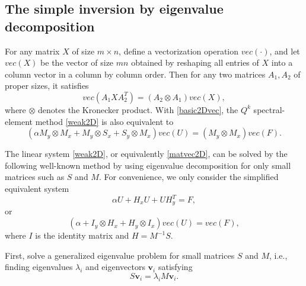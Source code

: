 \documentclass{article}
\begin{document}
\subsection{The simple inversion by eigenvalue decomposition}

For  any matrix $X$ of size $m\times n$, define a vectorization operation $vec(\cdot)$, and let $vec(X)$ be the vector of size $mn$ obtained by reshaping all entries of $X$ into a column vector in a column by column order. Then for any two matrices $A_1, A_2$ of proper sizes, it satisfies
\begin{equation}\label{basic2Dvec}
    vec(A_1XA_2^T) = \left(A_2\otimes A_1\right)vec(X),
\end{equation}
where $\otimes$ denotes the Kronecker product. With \eqref{basic2Dvec}, the $Q^k$ spectral-element method \eqref{weak2D} is also equivalent to 
\begin{equation}\label{matvec2D}
    (\alpha M_{y}\otimes M_{x} + {M_{y}\otimes S_{x} + S_{y}\otimes M_{x}})vec(U) = (M_{y}\otimes M_{x})vec(F).
\end{equation}



The linear system \eqref{weak2D}, or equivalently  \eqref{matvec2D}, can be solved by the following well-known method by using eigenvalue decomposition for only small matrices such as $S$ and $M$. For convenience, we only consider the simplified equivalent system 
\begin{equation}\label{weak2D-2}
    \alpha U  + H_{x}U  +  UH^T_{y} =  F,
\end{equation}
or 
\begin{equation}\label{matvec2D-3}
    (\alpha  + {I_{y}\otimes H_{x} + H_{y}\otimes I_{x}})vec(U) = vec(F),
\end{equation}
where $I$ is the identity matrix and $H=M^{-1}S$.

First, solve a generalized eigenvalue problem for small matrices $S$ and $M$, i.e., finding eigenvalues $\lambda_i$ and eigenvectors $\mathbf v_i$ satisfying
\begin{equation}
    S\mathbf v_i =\lambda_i M \mathbf v_i. \label{generalized-eig}
\end{equation}
\end{document}
